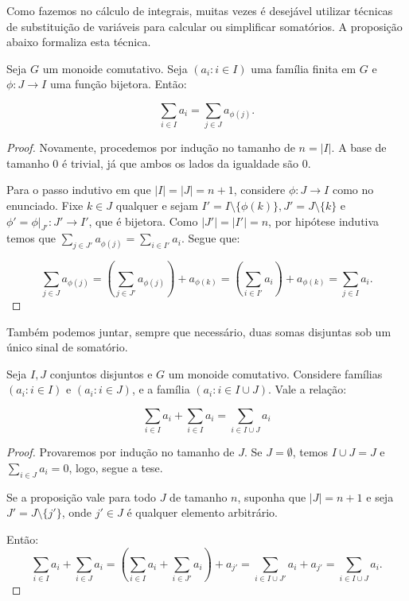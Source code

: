 Como fazemos no cálculo de integrais, muitas vezes é desejável utilizar técnicas de substituição de variáveis para calcular ou simplificar somatórios.
A proposição abaixo formaliza esta técnica.
\begin{prop}\label{prop:group_sumVarChange}   
    Seja $G$ um monoide comutativo.
    Seja $(a_i: i \in I)$ uma família finita em $G$ e $\phi:J\rightarrow I$ uma função bijetora.
    Então:

    \[\sum_{i \in I}a_i=\sum_{j \in J}a_{\phi(j)}.\]

\end{prop}
\begin{proof}
Novamente, procedemos por indução no tamanho de $n=|I|$.
A base de tamanho $0$ é trivial, já que ambos os lados da igualdade são $0$.

Para o passo indutivo em que $|I|=|J|=n+1$, considere $\phi:J\rightarrow I$ como no enunciado.
Fixe $k \in J$ qualquer e sejam $I'=I\setminus\{\phi(k)\}, J'=J\setminus\{k\}$ e $\phi'=\phi|_{J'}:J'\rightarrow I'$, que é bijetora.
Como $|J'|=|I'|=n$, por hipótese indutiva temos que $\sum_{j \in J'}a_{\phi(j)}=\sum_{i \in I'}a_i$.
Segue que:

\[\sum_{j \in J}a_{\phi(j)}=\left(\sum_{j \in J'}a_{\phi(j)}\right)+a_{\phi(k)}=\left(\sum_{i \in I'}a_{i}\right)+a_{\phi(k)}=\sum_{j \in I}a_{i}.\]
\end{proof}

Também podemos juntar, sempre que necessário, duas somas disjuntas sob um único sinal de somatório.
\begin{prop}\label{prop:group_sumConcat}
    Seja $I, J$ conjuntos disjuntos e $G$ um monoide comutativo. Considere famílias $(a_i: i \in I)$ e $(a_i: i \in J)$, e a família $(a_i: i \in I\cup J)$.
    Vale a relação:

    \[\sum_{i \in I}a_i+\sum_{i \in I}a_i=\sum_{i \in I\cup J}a_i\]
\end{prop}
\begin{proof}
    Provaremos por indução no tamanho de $J$.
    Se $J=\emptyset$, temos $I\cup J=J$ e $\sum_{i \in J}a_i=0$, logo, segue a tese.

    Se a proposição vale para todo $J$ de tamanho $n$, suponha que $|J|=n+1$ e seja $J'=J\setminus \{j'\}$, onde $j' \in J$ é qualquer elemento arbitrário.

    Então:
    \[\sum_{i \in I}a_i+\sum_{i \in J}a_i=\left(\sum_{i \in I}a_i+\sum_{i \in J'}a_i\right)+a_{j'}=\sum_{i \in I\cup J'}a_i+a_{j'}=\sum_{i \in I\cup J}a_i.\]
\end{proof}

